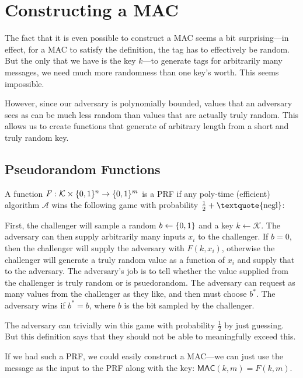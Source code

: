 \section{Constructing a MAC}
The fact that it is even possible to construct a MAC seems a bit surprising---in effect, for a MAC to satisfy the definition, the tag has to effectively be random. But the only  that we have is the key $k$---to generate tags for arbitrarily many messages, we need much more randomness than one key's worth. This seems impossible.

However, since our adversary is polynomially bounded, values that an adversary sees as  can be much less random than values that are actually truly random. This allows us to create functions that generate  of arbitrary length from a short and truly random key.

\subsection{Pseudorandom Functions}
\begin{definition}
	A function $F: \mathcal{K} \times \{0,1\}^n \rightarrow \{0,1\}^m$ is a PRF if any poly-time (efficient) algorithm $\mathcal{A}$ wins the following game with probability $\tfrac{1}{2} + \text{\textquote{negl}}$: 

	First, the challenger will sample a random $b \leftarrow \{0,1\}$ and a key $k \leftarrow \mathcal{K}$. The adversary can then supply arbitrarily many inputs $x_i$ to the challenger. If $b=0$, then the challenger will supply the adversary with $F(k, x_i)$, otherwise the challenger will generate a truly random value as a function of $x_i$ and supply that to the adversary. The adversary's job is to tell whether the value supplied from the challenger is truly random or is psuedorandom. The adversary can request as many values from the challenger as they like, and then must choose $b^*$. The adversary wins if $b^* = b$, where $b$ is the bit sampled by the challenger.

	The adversary can trivially win this game with probability $\tfrac{1}{2}$ by just guessing. But this definition says that they should not be able to meaningfully exceed this.
\end{definition}

If we had such a PRF, we could easily construct a MAC---we can just use the message as the input to the PRF along with the key: $\mathsf{MAC}(k, m) = F(k, m)$.

